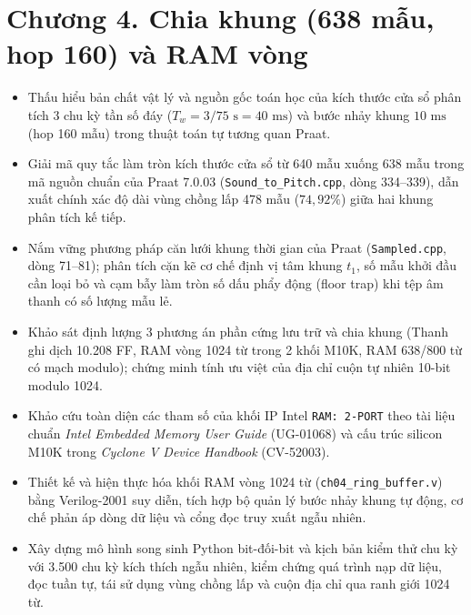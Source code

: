 \providecommand{\todo}[1]{\textcolor{red}{\textbf{[TODO: #1]}}}
\clearpage
{}
\section*{Chương 4. Chia khung (638 mẫu, hop 160) và RAM vòng}

\begin{learningobj}
\begin{itemize}[leftmargin=1.5em, itemsep=2pt]
    \item Thấu hiểu bản chất vật lý và nguồn gốc toán học của kích thước cửa sổ phân tích 3 chu kỳ tần số đáy ($T_w = 3/75\text{ s} = 40\text{ ms}$) và bước nhảy khung $10\text{ ms}$ (hop 160 mẫu) trong thuật toán tự tương quan Praat.
    \item Giải mã quy tắc làm tròn kích thước cửa sổ từ 640 mẫu xuống 638 mẫu trong mã nguồn chuẩn của Praat 7.0.03 (\texttt{Sound\_to\_Pitch.cpp}, dòng 334--339), dẫn xuất chính xác độ dài vùng chồng lấp 478 mẫu ($74{,}92\%$) giữa hai khung phân tích kế tiếp.
    \item Nắm vững phương pháp căn lưới khung thời gian của Praat (\texttt{Sampled.cpp}, dòng 71--81); phân tích cặn kẽ cơ chế định vị tâm khung $t_1$, số mẫu khởi đầu cần loại bỏ và cạm bẫy làm tròn số dấu phẩy động (floor trap) khi tệp âm thanh có số lượng mẫu lẻ.
    \item Khảo sát định lượng 3 phương án phần cứng lưu trữ và chia khung (Thanh ghi dịch 10.208 FF, RAM vòng 1024 từ trong 2 khối M10K, RAM 638/800 từ có mạch modulo); chứng minh tính ưu việt của địa chỉ cuộn tự nhiên 10-bit modulo 1024.
    \item Khảo cứu toàn diện các tham số của khối IP Intel \texttt{RAM: 2-PORT} theo tài liệu chuẩn \emph{Intel Embedded Memory User Guide} (UG-01068) và cấu trúc silicon M10K trong \emph{Cyclone V Device Handbook} (CV-52003).
    \item Thiết kế và hiện thực hóa khối RAM vòng 1024 từ (\texttt{ch04\_ring\_buffer.v}) bằng Verilog-2001 suy diễn, tích hợp bộ quản lý bước nhảy khung tự động, cơ chế phản áp dòng dữ liệu và cổng đọc truy xuất ngẫu nhiên.
    \item Xây dựng mô hình song sinh Python bit-đối-bit và kịch bản kiểm thử chu kỳ với 3.500 chu kỳ kích thích ngẫu nhiên, kiểm chứng quá trình nạp dữ liệu, đọc tuần tự, tái sử dụng vùng chồng lấp và cuộn địa chỉ qua ranh giới 1024 từ.
\end{itemize}
\end{learningobj}

